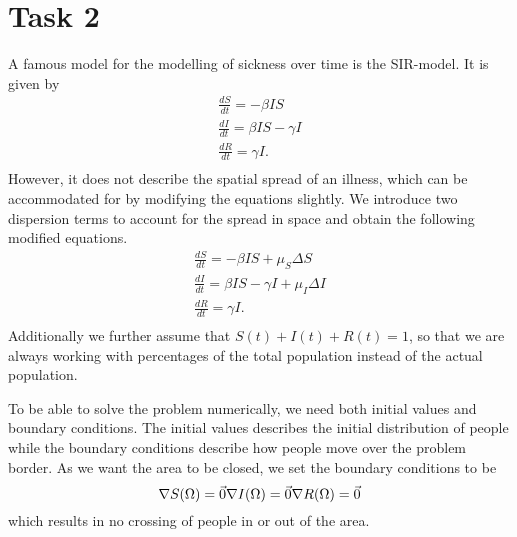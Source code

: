 \section{Task 2}

A famous model for the modelling of sickness over time is the SIR-model. It is given by
\begin{equation}
    \begin{array}{lcr}
        \frac{dS}{dt} = -\beta I S \\
        \frac{dI}{dt} = \beta IS - \gamma I \\
        \frac{dR}{dt} = \gamma I. \\
    \end{array}
\end{equation}
However, it does not describe the spatial spread of an illness, which can be accommodated for by modifying the equations slightly. We introduce
two dispersion terms to account for the spread in space and obtain the following modified equations.
\begin{equation}
    \begin{array}{lcr}
        \frac{dS}{dt} = -\beta I S + \mu_S \Delta S \\
        \frac{dI}{dt} = \beta IS - \gamma I + \mu_I \Delta I\\
        \frac{dR}{dt} = \gamma I. \\
    \end{array}
\end{equation}
Additionally we further assume that $S(t) + I(t) + R(t) = 1$, so that we are always working with percentages of the total population instead of the actual population.

To be able to solve the problem numerically, we need both initial values and boundary conditions. The initial values describes the initial distribution of people
while the boundary conditions describe how people move over the problem border. As we want the area to be closed, we set the boundary conditions to be
\begin{equation}
    \nabla S(\Omega) = \Vec{0} \\
    \nabla I(\Omega) = \Vec{0} \\
    \nabla R(\Omega) = \Vec{0} \\
\end{equation}
which results in no crossing of people in or out of the area.

